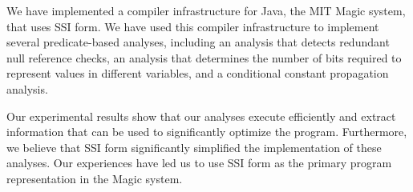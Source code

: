 We have implemented a compiler infrastructure for Java,
the MIT Magic system, that uses SSI form. We have used 
this compiler infrastructure to implement several 
predicate-based analyses, including an analysis that
detects redundant null reference checks, an
analysis that determines the number of bits
required to represent values in different variables,
and a conditional constant propagation analysis.

Our experimental results show that our analyses
execute efficiently and extract information that can
be used to significantly optimize the program.
Furthermore, we believe that SSI form significantly
simplified the implementation of these analyses.
Our experiences have led us to use SSI form 
as the primary program representation in the Magic
system.
